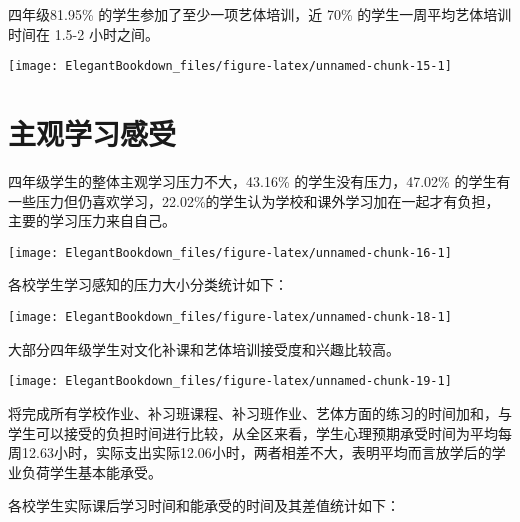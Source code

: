 \documentclass[cn, 11pt, fancy, hide]{elegantbook}
\begin{document}
四年级81.95\% 的学生参加了至少一项艺体培训，近 70\% 的学生一周平均艺体培训时间在 1.5-2 小时之间。

\begin{center}\texttt{[image: ElegantBookdown\_files/figure-latex/unnamed-chunk-15-1]} \end{center}

\hypertarget{section-5}{%
\section{主观学习感受}\label{section-5}}

四年级学生的整体主观学习压力不大，43.16\% 的学生没有压力，47.02\% 的学生有一些压力但仍喜欢学习，22.02\%的学生认为学校和课外学习加在一起才有负担，主要的学习压力来自自己。

\begin{center}\texttt{[image: ElegantBookdown\_files/figure-latex/unnamed-chunk-16-1]} \end{center}

各校学生学习感知的压力大小分类统计如下：

\begin{center}\texttt{[image: ElegantBookdown\_files/figure-latex/unnamed-chunk-18-1]} \end{center}

大部分四年级学生对文化补课和艺体培训接受度和兴趣比较高。

\begin{center}\texttt{[image: ElegantBookdown\_files/figure-latex/unnamed-chunk-19-1]} \end{center}

将完成所有学校作业、补习班课程、补习班作业、艺体方面的练习的时间加和，与学生可以接受的负担时间进行比较，从全区来看，学生心理预期承受时间为平均每周12.63小时，实际支出实际12.06小时，两者相差不大，表明平均而言放学后的学业负荷学生基本能承受。

各校学生实际课后学习时间和能承受的时间及其差值统计如下：
\end{document}
